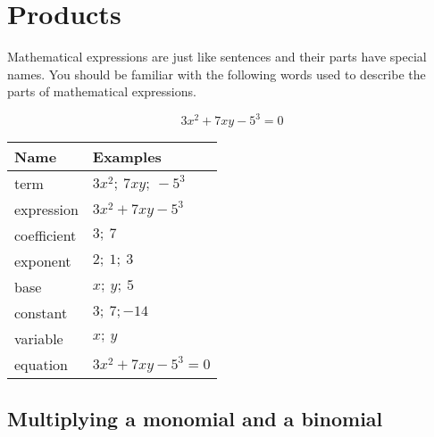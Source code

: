 \section{Products}
\setcounter{figure}{1}
\setcounter{subfigure}{1}
%   
\nopagebreak
Mathematical expressions are just like sentences and their parts have special names. You should be familiar with the following words used to describe the parts of  mathematical expressions.\par 

\begin{equation*}
3x^2 + 7xy - 5^3 = 0
\end{equation*}



\begin{table}[H]
\begin{center}
\begin{tabular}{|l|l|}
\hline
\textbf{Name} & \textbf{Examples} \\
\hline
term & $3x^2;~ 7xy;~ -5^3$\\ \hline
expression & $3x^2 + 7xy -5^3$\\ \hline
coefficient & $3;~7$\\ \hline
exponent & $2;~1;~3$\\ \hline
base & $x;~y;~5$\\ \hline
constant & $3;~7;-14$\\ \hline
variable & $x;~ y$\\ \hline
equation & $3x^2 + 7xy -5^3 = 0$\\ \hline


\end{tabular}
\end{center}
\end{table} 

\par

\subsection*{Multiplying a monomial and a binomial}

